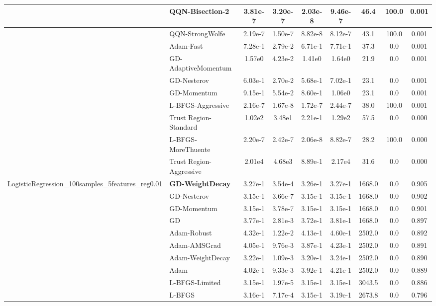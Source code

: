 \documentclass[10pt]{article}
\begin{document}
\begin{longtable}{|l|l|c|c|c|c|c|c|c|}
\hline
 & QQN-Bisection-2 & 3.81e-7 & 3.20e-7 & 2.03e-8 & 9.46e-7 & 46.4 & 100.0 & 0.001 \\
\hline
 & QQN-StrongWolfe & 2.19e-7 & 1.50e-7 & 8.82e-8 & 8.12e-7 & 43.1 & 100.0 & 0.001 \\
\hline
 & Adam-Fast & 7.28e-1 & 2.79e-2 & 6.71e-1 & 7.71e-1 & 37.3 & 0.0 & 0.001 \\
\hline
 & GD-AdaptiveMomentum & 1.57e0 & 4.23e-2 & 1.41e0 & 1.64e0 & 21.9 & 0.0 & 0.001 \\
\hline
 & GD-Nesterov & 6.03e-1 & 2.70e-2 & 5.68e-1 & 7.02e-1 & 23.1 & 0.0 & 0.001 \\
\hline
 & GD-Momentum & 9.15e-1 & 5.54e-2 & 8.60e-1 & 1.06e0 & 23.1 & 0.0 & 0.001 \\
\hline
 & L-BFGS-Aggressive & 2.16e-7 & 1.67e-8 & 1.72e-7 & 2.44e-7 & 38.0 & 100.0 & 0.001 \\
\hline
 & Trust Region-Standard & 1.02e2 & 3.48e1 & 2.21e-1 & 1.29e2 & 57.5 & 0.0 & 0.000 \\
\hline
 & L-BFGS-MoreThuente & 2.20e-7 & 2.42e-7 & 2.06e-8 & 8.82e-7 & 28.2 & 100.0 & 0.000 \\
\hline
 & Trust Region-Aggressive & 2.01e4 & 4.68e3 & 8.89e-1 & 2.17e4 & 31.6 & 0.0 & 0.000 \\
LogisticRegression\_100samples\_5features\_reg0.01 & \textbf{GD-WeightDecay} & 3.27e-1 & 3.54e-4 & 3.26e-1 & 3.27e-1 & 1668.0 & 0.0 & 0.905 \\
\hline
 & GD-Nesterov & 3.15e-1 & 3.66e-7 & 3.15e-1 & 3.15e-1 & 1668.0 & 0.0 & 0.902 \\
\hline
 & GD-Momentum & 3.15e-1 & 3.78e-7 & 3.15e-1 & 3.15e-1 & 1668.0 & 0.0 & 0.901 \\
\hline
 & GD & 3.77e-1 & 2.81e-3 & 3.72e-1 & 3.81e-1 & 1668.0 & 0.0 & 0.897 \\
\hline
 & Adam-Robust & 4.32e-1 & 1.22e-2 & 4.13e-1 & 4.60e-1 & 2502.0 & 0.0 & 0.892 \\
\hline
 & Adam-AMSGrad & 4.05e-1 & 9.76e-3 & 3.87e-1 & 4.23e-1 & 2502.0 & 0.0 & 0.891 \\
\hline
 & Adam-WeightDecay & 3.22e-1 & 1.09e-3 & 3.20e-1 & 3.24e-1 & 2502.0 & 0.0 & 0.890 \\
\hline
 & Adam & 4.02e-1 & 9.33e-3 & 3.92e-1 & 4.21e-1 & 2502.0 & 0.0 & 0.889 \\
\hline
 & L-BFGS-Limited & 3.15e-1 & 1.97e-5 & 3.15e-1 & 3.15e-1 & 3043.5 & 0.0 & 0.886 \\
\hline
 & L-BFGS & 3.16e-1 & 7.17e-4 & 3.15e-1 & 3.19e-1 & 2673.8 & 0.0 & 0.796 \\

\end{longtable}
\end{document}
